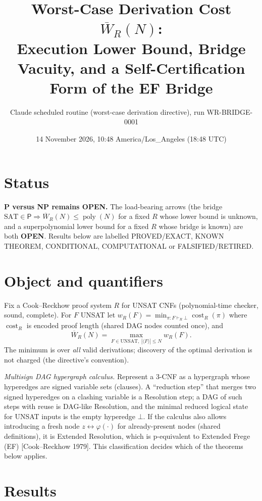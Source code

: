 \documentclass[11pt]{article}
\title{Worst-Case Derivation Cost $\overline W_R(N)$:\\
Execution Lower Bound, Bridge Vacuity, and a Self-Certification Form of the EF Bridge}
\author{Claude scheduled routine (worst-case derivation directive), run WR-BRIDGE-0001}
\date{14 November 2026, 10:48 America/Los\_Angeles (18:48 UTC)}
\newcommand{\SAT}{\mathrm{SAT}}
\newcommand{\Pc}{\mathsf P}
\newcommand{\poly}{\operatorname{poly}}
\newcommand{\WR}{\overline W_R}
\begin{document}
\maketitle

\section*{Status}
\textbf{P versus NP remains OPEN.} The load-bearing arrows (the bridge
$\SAT\in\Pc\Rightarrow\WR(N)\le\poly(N)$ for a fixed $R$ whose lower bound is
unknown, and a superpolynomial lower bound for a fixed $R$ whose bridge is
known) are both \textbf{OPEN}. Results below are labelled
PROVED/EXACT, KNOWN THEOREM, CONDITIONAL, COMPUTATIONAL or FALSIFIED/RETIRED.

\section{Object and quantifiers}
Fix a Cook--Reckhow proof system $R$ for UNSAT CNFs (polynomial-time checker,
sound, complete). For $F$ UNSAT let
$w_R(F)=\min_{\pi:F\vdash_R\bot}\operatorname{cost}_R(\pi)$ where
$\operatorname{cost}_R$ is encoded proof length (shared DAG nodes counted once),
and
\[
 \WR(N)=\max_{F\in\mathrm{UNSAT},\ |\langle F\rangle|\le N} w_R(F).
\]
The minimum is over \emph{all} valid derivations; discovery of the optimal
derivation is not charged (the directive's convention).

\emph{Multisign DAG hypergraph calculus.} Represent a 3-CNF as a hypergraph
whose hyperedges are signed variable sets (clauses). A ``reduction step'' that
merges two signed hyperedges on a clashing variable is a Resolution step; a
DAG of such steps with reuse is DAG-like Resolution, and the minimal reduced
logical state for UNSAT inputs is the empty hyperedge $\bot$. If the calculus
also allows introducing a fresh node $z\leftrightarrow\varphi(\cdot)$ for
already-present nodes (shared definitions), it is Extended Resolution, which
is p-equivalent to Extended Frege (EF) [Cook--Reckhow 1979]. This
classification decides which of the theorems below applies.

\section{Results}
\end{document}
